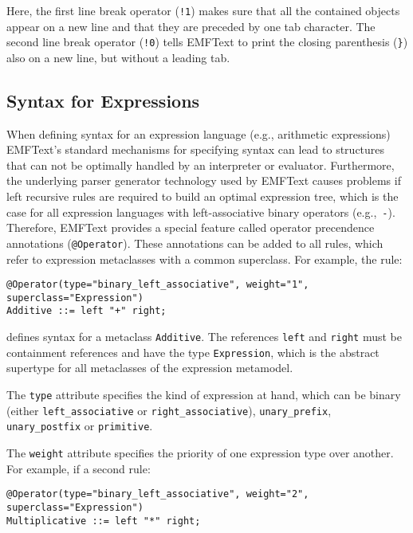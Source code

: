 Here, the first line break operator (\texttt{!1}) makes sure that all the
contained objects appear on a new line and that they are preceded by one tab
character. The second line break operator (\texttt{!0}) tells EMFText to print
the closing parenthesis (\texttt{\}}) also on a new line, but without a leading
tab.

\subsection{Syntax for Expressions}
When defining syntax for an expression language (e.g., arithmetic expressions) 
EMFText's standard mechanisms for specifying syntax can lead to structures that 
can not be optimally handled by an interpreter or evaluator. Furthermore, the 
underlying parser generator technology used by EMFText causes problems if 
left recursive rules are required to build an optimal expression tree, which is 
the case for all expression languages with left-associative binary operators 
(e.g.,~\texttt{-}). Therefore, EMFText provides a special feature called
operator precendence annotations (\texttt{@Operator}). These annotations can be
added to all rules, which refer to expression metaclasses with a common
superclass. For example, the rule:

\lstset{language=CS}
\begin{lstlisting}
@Operator(type="binary_left_associative", weight="1", superclass="Expression")
Additive ::= left "+" right;
\end{lstlisting}

defines syntax for a metaclass \texttt{Additive}. The references \texttt{left}
and \texttt{right} must be containment references and have the type
\texttt{Expression}, which is the abstract supertype for all metaclasses of the
expression metamodel.

The \texttt{type} attribute specifies the kind of expression at hand, which can
be binary (either \texttt{left\_associative} or \texttt{right\_associative}),
\texttt{unary\_prefix}, \texttt{unary\_postfix} or \texttt{primitive}.

The \texttt{weight} attribute specifies the priority of one expression type over
another. For example, if a second rule:

\lstset{language=CS}
\begin{lstlisting}
@Operator(type="binary_left_associative", weight="2", superclass="Expression")
Multiplicative ::= left "*" right;
\end{lstlisting}

